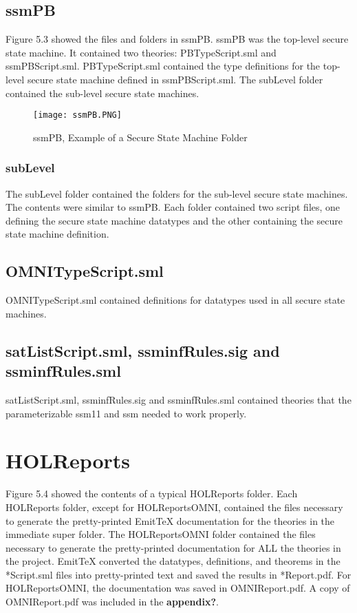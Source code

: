 \subsection*{ssmPB}
\label{sec:ssmpb}

Figure 5.3 showed the files and folders in ssmPB.  ssmPB was the top-level secure
state machine.  It contained two theories: PBTypeScript.sml and ssmPBScript.sml.
PBTypeScript.sml contained the type definitions for the top-level secure state machine
defined in ssmPBScript.sml.  The subLevel folder contained the sub-level secure state machines.

\begin{figure}[h]
  \centering
  \texttt{[image: ssmPB.PNG]}
  \caption{ssmPB, Example of a Secure State Machine Folder}
\end{figure}

\subsubsection*{subLevel}
\label{sec:sublevel}

The subLevel folder contained the folders for the sub-level secure state machines.
The contents were similar to ssmPB.  Each folder contained two script files,
one defining the secure state machine datatypes and the other containing the
secure state machine definition.

\subsection*{OMNITypeScript.sml}
\label{sec:omnitypescript.sml}

OMNITypeScript.sml contained definitions for datatypes used in all secure state machines.

\subsection*{satListScript.sml, ssminfRules.sig and ssminfRules.sml}
\label{sec:satl-ssminfr-ssminfr}

satListScript.sml, ssminfRules.sig and ssminfRules.sml contained theories that the
parameterizable ssm11 and ssm needed to work properly.

\section*{HOLReports}
\label{sec:holreports}

Figure 5.4 showed the contents of a typical HOLReports folder.  Each HOLReports folder,
except for HOLReportsOMNI, contained the files necessary to generate the pretty-printed
EmitTeX documentation for the theories in the immediate super folder.  The HOLReportsOMNI
folder contained the files necessary to generate the pretty-printed documentation for
ALL the theories in the project.  EmitTeX converted the datatypes, definitions, and
theorems in the *Script.sml files into pretty-printed text and saved the results in *Report.pdf.
For HOLReportsOMNI, the documentation was saved in OMNIReport.pdf.  A copy of OMNIReport.pdf
was included in the \textbf{appendix?}.  

